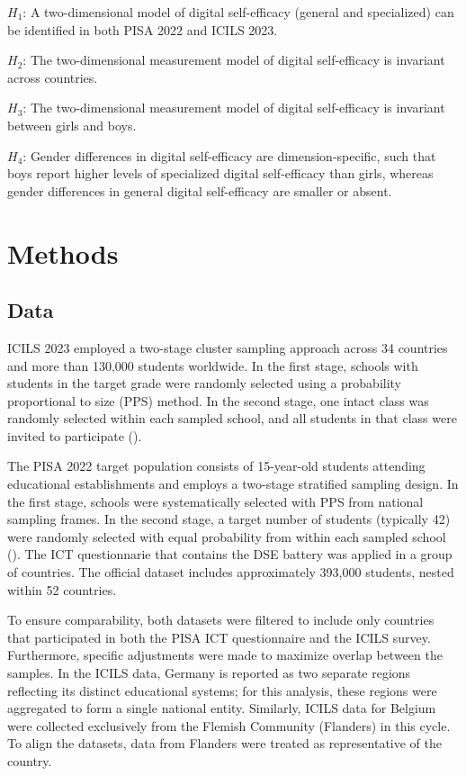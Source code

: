 \documentclass[
  letterpaper,
  DIV=11,
  numbers=noendperiod]{scrartcl}
\begin{document}
\(H_{1}\): A two-dimensional model of digital self-efficacy (general and
specialized) can be identified in both PISA 2022 and ICILS 2023.

\(H_{2}\): The two-dimensional measurement model of digital
self-efficacy is invariant across countries.

\(H_{3}\): The two-dimensional measurement model of digital
self-efficacy is invariant between girls and boys.

\(H_{4}\): Gender differences in digital self-efficacy are
dimension-specific, such that boys report higher levels of specialized
digital self-efficacy than girls, whereas gender differences in general
digital self-efficacy are smaller or absent.

\section{Methods}\label{methods}

\subsection{Data}\label{data}

ICILS 2023 employed a two-stage cluster sampling approach across 34
countries and more than 130,000 students worldwide. In the first stage,
schools with students in the target grade were randomly selected using a
probability proportional to size (PPS) method. In the second stage, one
intact class was randomly selected within each sampled school, and all
students in that class were invited to participate
().

The PISA 2022 target population consists of 15-year-old students
attending educational establishments and employs a two-stage stratified
sampling design. In the first stage, schools were systematically
selected with PPS from national sampling frames. In the second stage, a
target number of students (typically 42) were randomly selected with
equal probability from within each sampled school
(). The ICT questionnarie that
contains the DSE battery was applied in a group of countries. The
official dataset includes approximately 393,000 students, nested within
52 countries.

To ensure comparability, both datasets were filtered to include only
countries that participated in both the PISA ICT questionnaire and the
ICILS survey. Furthermore, specific adjustments were made to maximize
overlap between the samples. In the ICILS data, Germany is reported as
two separate regions reflecting its distinct educational systems; for
this analysis, these regions were aggregated to form a single national
entity. Similarly, ICILS data for Belgium were collected exclusively
from the Flemish Community (Flanders) in this cycle. To align the
datasets, data from Flanders were treated as representative of the
country.
\end{document}
